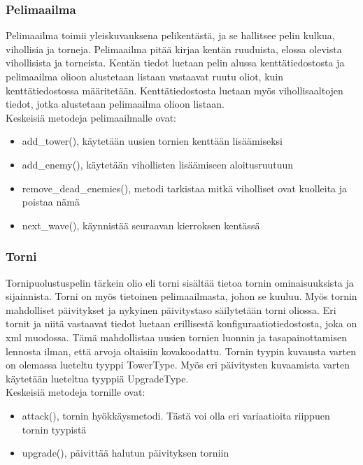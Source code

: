 \documentclass{article}
\begin{document}
\subsubsection{Pelimaailma}

\noindent Pelimaailma toimii yleiskuvauksena pelikentästä, ja se hallitsee pelin kulkua, vihollisia ja torneja. Pelimaailma pitää kirjaa kentän ruuduista, elossa olevista vihollisista ja torneista. Kentän tiedot luetaan pelin alussa kenttä\-tiedostosta ja pelimaailma olioon alustetaan listaan vastaavat ruutu oliot, kuin kenttä\-tiedostossa määritetään. Kenttätiedostosta luetaan myös vihollisaaltojen tiedot, jotka alustetaan pelimaailma olioon listaan. \\


\noindent Keskeisiä metodeja pelimaailmalle ovat:
\begin{itemize}
    \item add\_tower(), käytetään uusien tornien kenttään lisäämiseksi
    \item add\_enemy(), käytetään vihollisten lisäämiseen aloitusruutuun
    \item remove\_dead\_enemies(), metodi tarkistaa mitkä viholliset ovat kuolleita ja poistaa nämä
    \item next\_wave(), käynnistää seuraavan kierroksen kentässä
\end{itemize}

\subsubsection{Torni}

\noindent Tornipuolustuspelin tärkein olio eli torni sisältää tietoa tornin ominaisuuksista ja sijainnista. Torni on myös tietoinen pelimaailmasta, johon se kuuluu. Myös tornin mahdolliset päivitykset ja nykyinen päivitystaso säilytetään torni oliossa. Eri tornit ja niitä vastaavat tiedot luetaan erillisestä konfiguraatiotiedostosta, joka on xml muodossa. Tämä mahdollistaa uusien tornien luonnin ja tasapainottamisen lennosta ilman, että arvoja oltaisiin kovakoodattu. Tornin tyypin kuvausta varten on olemassa lueteltu tyyppi TowerType. Myös eri päivitysten kuvaamista varten käytetään lueteltua tyyppiä UpgradeType. \\

\newpage
\noindent Keskeisiä metodeja tornille ovat:
\begin{itemize}
    \item attack(), tornin hyökkäysmetodi. Tästä voi olla eri variaatioita riippuen tornin tyypistä
    \item upgrade(), päivittää halutun päivityksen torniin
\end{itemize}
\end{document}
